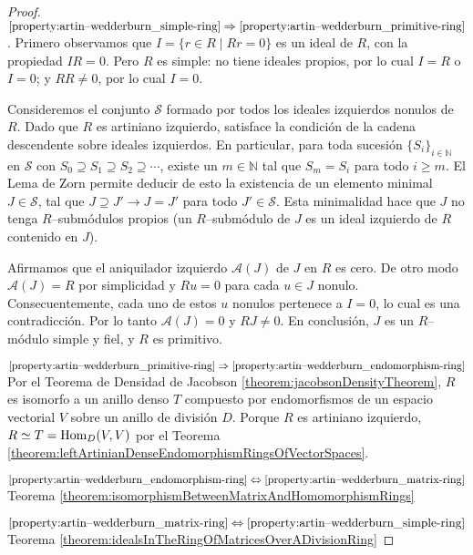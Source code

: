 \documentclass{report}
\newcommand{\naturalNumbers}{\mathbb{N}}
\newcommand{\Hom}{\textnormal{Hom}}
\begin{document}
  \begin{proof}
    \(\ref{property:artin--wedderburn_simple-ring} \Rightarrow \ref{property:artin--wedderburn_primitive-ring}\).
    Primero observamos que \(I = \{r \in R \mid R r = 0\}\) es un ideal de \(R\), con la propiedad \(I R = 0\).
    Pero \(R\) es simple: no tiene ideales propios, por lo cual \(I = R\) o \(I = 0\);
    y \(R R \neq 0\), por lo cual \(I = 0\).

    Consideremos el conjunto \(\mathcal{S}\) formado por todos los ideales izquierdos nonulos de \(R\).
    Dado que \(R\) es artiniano izquierdo, satisface la condición de la cadena descendente sobre ideales izquierdos.
    En particular, para toda sucesión \(\{S_i\}_{i \in \naturalNumbers}\) en \(\mathcal{S}\) con \(S_0 \supseteq S_1 \supseteq S_2 \supseteq \cdots\), existe un \(m \in \naturalNumbers\) tal que \(S_m = S_i\) para todo \(i \geq m\).
    El Lema de Zorn permite deducir de esto la existencia de un elemento minimal \(J \in \mathcal{S}\), tal que \(J \supseteq J' \rightarrow J = J'\) para todo \(J' \in \mathcal{S}\).
    Esta minimalidad hace que \(J\) no tenga \(R\)--submódulos propios (un \(R\)--submódulo de \(J\) es un ideal izquierdo de \(R\) contenido en \(J\)).

    Afirmamos que el aniquilador izquierdo \(\mathcal{A}(J)\) de \(J\) en \(R\) es cero.
    De otro modo \(\mathcal{A}(J) = R\) por simplicidad y \(R u = 0\) para cada \(u \in J\) nonulo.
    Consecuentemente, cada uno de estos \(u\) nonulos pertenece a \(I = 0\), lo cual es una contradicción.
    Por lo tanto \(\mathcal{A}(J) = 0\) y \(R J \neq 0\).
    En conclusión, \(J\) es un \(R\)--módulo simple y fiel, y \(R\) es primitivo.

    \(\ref{property:artin--wedderburn_primitive-ring} \Rightarrow \ref{property:artin--wedderburn_endomorphism-ring}\)
    Por el Teorema de Densidad de Jacobson \ref{theorem:jacobsonDensityTheorem}, \(R\) es isomorfo a un anillo denso \(T\) compuesto por endomorfismos de un espacio vectorial \(V\) sobre un anillo de división \(D\).
    Porque \(R\) es artiniano izquierdo, \(R \simeq T = \Hom _D(V, V)\) por el Teorema \ref{theorem:leftArtinianDenseEndomorphismRingsOfVectorSpaces}.

    \(\ref{property:artin--wedderburn_endomorphism-ring} \Leftrightarrow \ref{property:artin--wedderburn_matrix-ring}\)
    Teorema \ref{theorem:isomorphismBetweenMatrixAndHomomorphismRings}

    \(\ref{property:artin--wedderburn_matrix-ring} \Leftrightarrow \ref{property:artin--wedderburn_simple-ring}\)
    Teorema \ref{theorem:idealsInTheRingOfMatricesOverADivisionRing}
  \end{proof}
\end{document}
